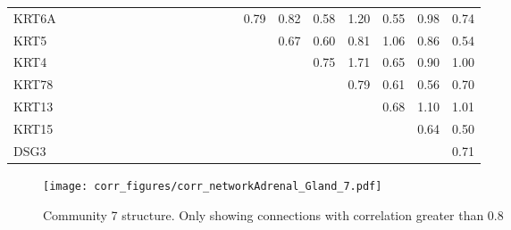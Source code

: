\begin{longtable}{lrrrrrrrrrrrrrrrrrrrrr}
KRT6A     &            &           &              &             &              &              &              &               &                 &             &             &             &             &             &       0.79 &       0.82 &        0.58 &        1.20 &        0.55 &       0.98 &       0.74 \\
KRT5      &            &           &              &             &              &              &              &               &                 &             &             &             &             &             &            &       0.67 &        0.60 &        0.81 &        1.06 &       0.86 &       0.54 \\
KRT4      &            &           &              &             &              &              &              &               &                 &             &             &             &             &             &            &            &        0.75 &        1.71 &        0.65 &       0.90 &       1.00 \\
KRT78     &            &           &              &             &              &              &              &               &                 &             &             &             &             &             &            &            &             &        0.79 &        0.61 &       0.56 &       0.70 \\
KRT13     &            &           &              &             &              &              &              &               &                 &             &             &             &             &             &            &            &             &             &        0.68 &       1.10 &       1.01 \\
KRT15     &            &           &              &             &              &              &              &               &                 &             &             &             &             &             &            &            &             &             &             &       0.64 &       0.50 \\
DSG3      &            &           &              &             &              &              &              &               &                 &             &             &             &             &             &            &            &             &             &             &            &       0.71 \\
\end{longtable}


\begin{figure}[h!]
\centering
\texttt{[image: corr\_figures/corr\_networkAdrenal\_Gland\_7.pdf]}
\caption{Community 7 structure. Only showing connections with correlation greater than 0.8}
\end{figure}




